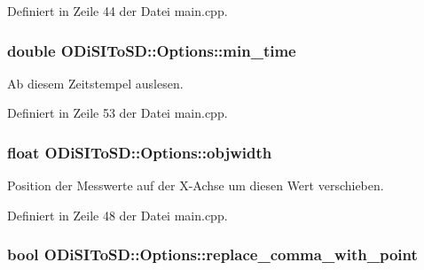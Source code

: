 Definiert in Zeile 44 der Datei main.\-cpp.

\hypertarget{structODiSIToSD_1_1Options_a2cf09094e48b7f721d5b4985fdf8bcf4}{
\subsubsection[{min\-\_\-time}]{\setlength{\rightskip}{0pt plus 5cm}double O\-Di\-S\-I\-To\-S\-D\-::\-Options\-::min\-\_\-time}}\label{structODiSIToSD_1_1Options_a2cf09094e48b7f721d5b4985fdf8bcf4}


Ab diesem Zeitstempel auslesen. 



Definiert in Zeile 53 der Datei main.\-cpp.

\hypertarget{structODiSIToSD_1_1Options_a3819b09fef274e4cbc06b52f9d70e493}{
\subsubsection[{objwidth}]{\setlength{\rightskip}{0pt plus 5cm}float O\-Di\-S\-I\-To\-S\-D\-::\-Options\-::objwidth}}\label{structODiSIToSD_1_1Options_a3819b09fef274e4cbc06b52f9d70e493}


Position der Messwerte auf der X-\/\-Achse um diesen Wert verschieben. 



Definiert in Zeile 48 der Datei main.\-cpp.

\hypertarget{structODiSIToSD_1_1Options_a5a14dc70f56c2ba965fc1af42a903c17}{
\subsubsection[{replace\-\_\-comma\-\_\-with\-\_\-point}]{\setlength{\rightskip}{0pt plus 5cm}bool O\-Di\-S\-I\-To\-S\-D\-::\-Options\-::replace\-\_\-comma\-\_\-with\-\_\-point}}\label{structODiSIToSD_1_1Options_a5a14dc70f56c2ba965fc1af42a903c17}


